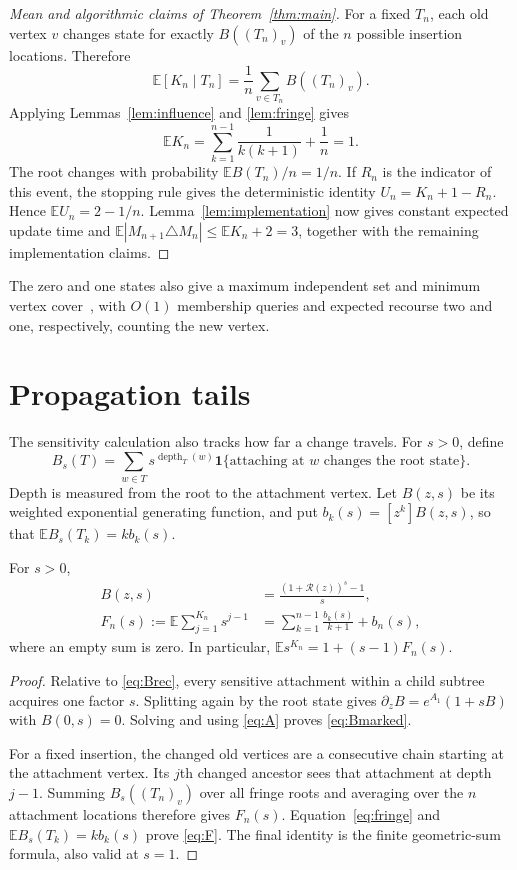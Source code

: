 \documentclass[runningheads,envcountsame,orivec]{llncs}
\newcommand{\E}{\mathbb E}
\newcommand{\ind}{\mathbf 1}
\newcommand{\R}{\mathcal R}
\begin{document}
\begin{proof}[Mean and algorithmic claims of Theorem~\ref{thm:main}]
For a fixed $T_n$, each old vertex $v$ changes state for exactly
$B((T_n)_v)$ of the $n$ possible insertion locations. Therefore
\[
 \E[K_n\mid T_n]=\frac1n\sum_{v\in T_n}B((T_n)_v).
\]
Applying Lemmas~\ref{lem:influence} and \ref{lem:fringe} gives
\[
 \E K_n=\sum_{k=1}^{n-1}\frac1{k(k+1)}+\frac1n=1.
\]
The root changes with probability $\E B(T_n)/n=1/n$. If $R_n$ is the
indicator of this event, the stopping rule gives the deterministic
identity $U_n=K_n+1-R_n$. Hence $\E U_n=2-1/n$.
Lemma~\ref{lem:implementation} now gives constant expected update time
and $\E|M_{n+1}\triangle M_n|\le\E K_n+2=3$, together with the
remaining implementation claims.
\end{proof}

The zero and one states also give a maximum independent set and minimum
vertex cover~\cite{Janson2020}, with $O(1)$ membership queries and
expected recourse two and one, respectively, counting the new vertex.

\section{Propagation tails}\label{sec:tails}

The sensitivity calculation also tracks how far a change travels. For
$s>0$, define
\[
 B_s(T)=\sum_{w\in T}
 s^{\operatorname{depth}_T(w)}
 \ind\{\text{attaching at }w\text{ changes the root state}\}.
\]
Depth is measured from the root to the attachment vertex. Let
$B(z,s)$ be its weighted exponential generating function, and put
$b_k(s)=[z^k]B(z,s)$, so that $\E B_s(T_k)=k b_k(s)$.

\begin{lemma}\label{lem:marked}
For $s>0$,
\begin{align}
 B(z,s)&=\frac{(1+\R(z))^s-1}{s},\label{eq:Bmarked}\\
 F_n(s):=\E\sum_{j=1}^{K_n}s^{j-1}
 &=\sum_{k=1}^{n-1}\frac{b_k(s)}{k+1}+b_n(s),\label{eq:F}
 \end{align}
where an empty sum is zero. In particular,
$\E s^{K_n}=1+(s-1)F_n(s)$.
\end{lemma}
\begin{proof}
Relative to \eqref{eq:Brec}, every sensitive attachment within a child
subtree acquires one factor $s$. Splitting again by the root state gives
$\partial_z B=e^{A_1}(1+sB)$ with $B(0,s)=0$. Solving and using
\eqref{eq:A} proves \eqref{eq:Bmarked}.

For a fixed insertion, the changed old vertices are a consecutive chain
starting at the attachment vertex. Its $j$th changed ancestor sees that
attachment at depth $j-1$. Summing $B_s((T_n)_v)$ over all fringe roots
and averaging over the $n$ attachment locations therefore gives $F_n(s)$.
Equation~\eqref{eq:fringe} and $\E B_s(T_k)=k b_k(s)$ prove
\eqref{eq:F}. The final identity is the finite geometric-sum formula,
also valid at $s=1$.
\end{proof}
\end{document}
